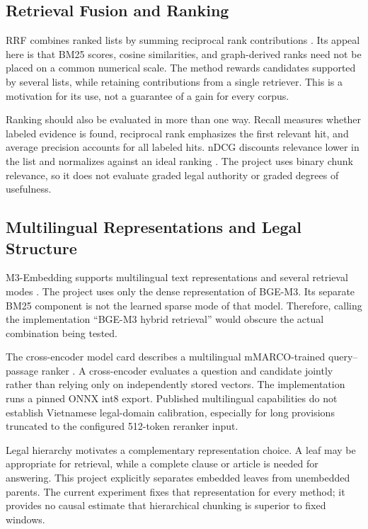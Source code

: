 \subsection{Retrieval Fusion and Ranking}
RRF combines ranked lists by summing reciprocal rank contributions \citep{cormack2009rrf}. Its appeal here is that BM25 scores, cosine similarities, and graph-derived ranks need not be placed on a common numerical scale. The method rewards candidates supported by several lists, while retaining contributions from a single retriever. This is a motivation for its use, not a guarantee of a gain for every corpus.

Ranking should also be evaluated in more than one way. Recall measures whether labeled evidence is found, reciprocal rank emphasizes the first relevant hit, and average precision accounts for all labeled hits. nDCG discounts relevance lower in the list and normalizes against an ideal ranking \citep{jarvelin2002gain}. The project uses binary chunk relevance, so it does not evaluate graded legal authority or graded degrees of usefulness.

\subsection{Multilingual Representations and Legal Structure}
M3-Embedding supports multilingual text representations and several retrieval modes \citep{chen2024m3}. The project uses only the dense representation of BGE-M3. Its separate BM25 component is not the learned sparse mode of that model. Therefore, calling the implementation ``BGE-M3 hybrid retrieval'' would obscure the actual combination being tested.

The cross-encoder model card describes a multilingual mMARCO-trained query--passage ranker \citep{mmarco}. A cross-encoder evaluates a question and candidate jointly rather than relying only on independently stored vectors. The implementation runs a pinned ONNX int8 export. Published multilingual capabilities do not establish Vietnamese legal-domain calibration, especially for long provisions truncated to the configured 512-token reranker input.

Legal hierarchy motivates a complementary representation choice. A leaf may be appropriate for retrieval, while a complete clause or article is needed for answering. This project explicitly separates embedded leaves from unembedded parents. The current experiment fixes that representation for every method; it provides no causal estimate that hierarchical chunking is superior to fixed windows.

